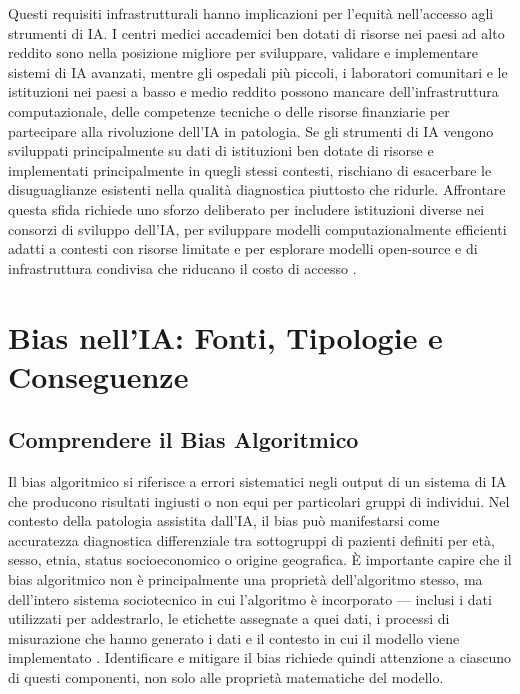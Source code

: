 Questi requisiti infrastrutturali hanno implicazioni per l'equità nell'accesso agli strumenti di IA. I centri medici accademici ben dotati di risorse nei paesi ad alto reddito sono nella posizione migliore per sviluppare, validare e implementare sistemi di IA avanzati, mentre gli ospedali più piccoli, i laboratori comunitari e le istituzioni nei paesi a basso e medio reddito possono mancare dell'infrastruttura computazionale, delle competenze tecniche o delle risorse finanziarie per partecipare alla rivoluzione dell'IA in patologia. Se gli strumenti di IA vengono sviluppati principalmente su dati di istituzioni ben dotate di risorse e implementati principalmente in quegli stessi contesti, rischiano di esacerbare le disuguaglianze esistenti nella qualità diagnostica piuttosto che ridurle. Affrontare questa sfida richiede uno sforzo deliberato per includere istituzioni diverse nei consorzi di sviluppo dell'IA, per sviluppare modelli computazionalmente efficienti adatti a contesti con risorse limitate e per esplorare modelli open-source e di infrastruttura condivisa che riducano il costo di accesso \cite{chen2023}.

\section{Bias nell'IA: Fonti, Tipologie e Conseguenze}
\label{sec:ch5_bias}

\subsection{Comprendere il Bias Algoritmico}

Il bias algoritmico si riferisce a errori sistematici negli output di un sistema di IA che producono risultati ingiusti o non equi per particolari gruppi di individui. Nel contesto della patologia assistita dall'IA, il bias può manifestarsi come accuratezza diagnostica differenziale tra sottogruppi di pazienti definiti per età, sesso, etnia, status socioeconomico o origine geografica. È importante capire che il bias algoritmico non è principalmente una proprietà dell'algoritmo stesso, ma dell'intero sistema sociotecnico in cui l'algoritmo è incorporato — inclusi i dati utilizzati per addestrarlo, le etichette assegnate a quei dati, i processi di misurazione che hanno generato i dati e il contesto in cui il modello viene implementato \cite{hanna2024}. Identificare e mitigare il bias richiede quindi attenzione a ciascuno di questi componenti, non solo alle proprietà matematiche del modello.

